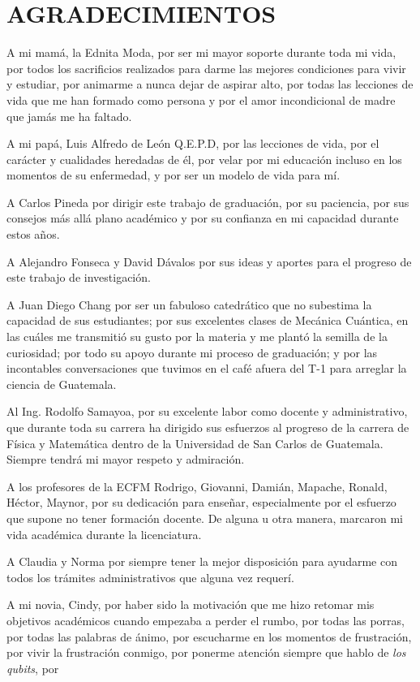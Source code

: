 \chapter*{AGRADECIMIENTOS}
\thispagestyle{empty}

A mi mamá, la Ednita Moda, por ser mi mayor soporte durante toda mi vida,
por todos los sacrificios realizados para darme las mejores condiciones para 
vivir y estudiar, por animarme a nunca dejar de aspirar alto, por todas las 
lecciones de vida que me han formado como persona y por el amor incondicional
de madre que jamás me ha faltado.

A mi papá, Luis Alfredo de León Q.E.P.D, por las lecciones de vida, por el 
carácter y cualidades heredadas de él, por velar por mi educación incluso 
en los momentos de su enfermedad, y por ser un modelo de vida para mí.

A Carlos Pineda por dirigir este trabajo de graduación, por su paciencia,
por sus consejos más allá plano académico y por su confianza en mi capacidad 
durante estos años.

A Alejandro Fonseca y David Dávalos por sus ideas y aportes para el progreso
de este trabajo de investigación.

A Juan Diego Chang por ser un fabuloso catedrático que no subestima la capacidad
de sus estudiantes; por sus excelentes clases de Mecánica Cuántica, en las cuáles 
me transmitió su gusto por la materia y me plantó la semilla de la curiosidad;
por todo su apoyo durante mi proceso de graduación;  
y por las incontables conversaciones que tuvimos en el café afuera del T-1
para arreglar la ciencia de Guatemala.

Al Ing. Rodolfo Samayoa, por su excelente labor como docente y administrativo, 
que durante toda su carrera ha dirigido sus esfuerzos al progreso de la carrera 
de Física y Matemática dentro de la Universidad de San Carlos de Guatemala. 
Siempre tendrá mi mayor respeto y admiración.

A los profesores de la ECFM Rodrigo, Giovanni, Damián, Mapache, Ronald, Héctor, Maynor, 
por su dedicación para enseñar, especialmente por el esfuerzo que supone 
no tener formación docente. De alguna u otra manera, marcaron mi vida 
académica durante la licenciatura. 

A Claudia y Norma por siempre tener la mejor disposición para ayudarme 
con todos los trámites administrativos que alguna vez requerí. 

A mi novia, Cindy, por haber sido la motivación que me hizo retomar mis 
objetivos académicos cuando empezaba a perder el rumbo, por todas las porras, 
por todas las palabras de ánimo, por escucharme en los momentos de frustración, 
por vivir la frustración conmigo, por ponerme atención siempre que hablo de 
\textit{los qubits}, por 

